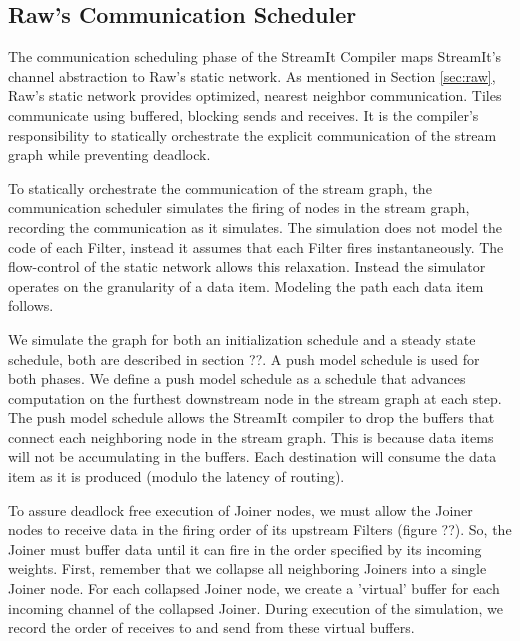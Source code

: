 
\subsection{Raw's Communication Scheduler}
\label{sec:rawcommunic}

The communication scheduling phase of the StreamIt Compiler maps
StreamIt's channel abstraction to Raw's static network.  As mentioned
in Section \ref{sec:raw}, Raw's static network provides optimized, nearest
neighbor communication.  Tiles communicate using buffered, blocking
sends and receives.  It is the compiler's responsibility to statically
orchestrate the explicit communication of the stream graph while
preventing deadlock.

To statically orchestrate the communication of the stream graph, the
communication scheduler simulates the firing of nodes in the stream
graph, recording the communication as it simulates.  The simulation
does not model the code of each Filter, instead it assumes that each
Filter fires instantaneously.  The flow-control of the static network
allows this relaxation.  Instead the simulator operates on the
granularity of a data item.  Modeling the path each data item follows.

We simulate the graph for both an initialization schedule and a steady
state schedule, both are described in section ??.  A push model
schedule is used for both phases.  We define a push model schedule as
a schedule that advances computation on the furthest downstream node
in the stream graph at each step.  The push model schedule allows the
StreamIt compiler to drop the buffers that connect each neighboring
node in the stream graph.  This is because data items will not be
accumulating in the buffers.  Each destination will consume the data
item as it is produced (modulo the latency of routing).

To assure deadlock free execution of Joiner nodes, we must allow the
Joiner nodes to receive data in the firing order of its upstream
Filters (figure ??). So, the Joiner must buffer data until it can fire
in the order specified by its incoming weights.  First, remember that
we collapse all neighboring Joiners into a single Joiner node.  For
each collapsed Joiner node, we create a 'virtual' buffer for each
incoming channel of the collapsed Joiner.  During execution of the
simulation, we record the order of receives to and send from these
virtual buffers.

